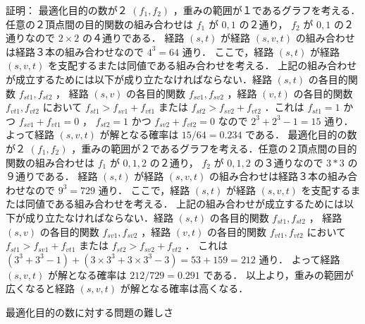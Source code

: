 \documentclass[12pt]{optlab-bachelor}
\begin{document}
証明：
最適化目的の数が２ $(f_1,f_2)$ ，重みの範囲が１であるグラフを考える．任意の２頂点間の目的関数の組み合わせは
$f_1$ が $0,1$ の２通り， $f_2$ が $0,1$ の２通りなので $2 \times 2$ の４通りである．
経路 $(s,t)$ が経路 $(s,v,t)$ の組み合わせは経路３本の組み合わせなので $4^3 = 64$ 通り．
ここで，経路 $(s,t)$ が経路 $(s,v,t)$ を支配するまたは同値である組み合わせを考える．
上記の組み合わせが成立するためには以下が成り立たなければならない．経路 $(s,t)$ の各目的関数 $f_{st1},f_{st2}$ ，
経路 $(s,v)$ の各目的関数 $f_{sv1},f_{sv2}$ ，経路 $(v,t)$ の各目的関数 $f_{vt1},f_{vt2}$ において
 $f_{st1}>f_{sv1}+f_{vt1}$ または $f_{st2}>f_{sv2}+f_{vt2}$ ．これは $f_{st1}=1$ かつ $f_{sv1}+f_{vt1}=0$ ，
 $f_{st2}=1$ かつ $f_{sv2}+f_{vt2}=0$ なので $2^3+2^3-1=15$ 通り．
よって経路 $(s,v,t)$ が解となる確率は $15/64=0.234$ である．
最適化目的の数が２ $(f_1,f_2)$ ，重みの範囲が２であるグラフを考える．任意の２頂点間の目的関数の組み合わせは
 $f_1$ が $0,1,2$ の２通り， $f_2$ が $0,1,2$ の３通りなので $3*3$ の９通りである．
経路 $(s,t)$ が経路 $(s,v,t)$ の組み合わせは経路３本の組み合わせなので $9^3 = 729$ 通り．
ここで，経路 $(s,t)$ が経路 $(s,v,t)$ を支配するまたは同値である組み合わせを考える．
上記の組み合わせが成立するためには以下が成り立たなければならない．経路 $(s,t)$ の各目的関数 $f_{st1},f_{st2}$ ，
経路 $(s,v)$ の各目的関数 $f_{sv1},f_{sv2}$ ，経路 $(v,t)$ の各目的関数 $f_{vt1},f_{vt2}$ において
 $f_{st1}>f_{sv1}+f_{vt1}$ または $f_{st2}>f_{sv2}+f_{vt2}$ ．
これは $(3^3+3^3-1)+(3 \times 3^3 + 3 \times 3^3 - 3)=53+159=212$ 通り．
よって経路 $(s,v,t)$ が解となる確率は $212/729=0.291$ である．
以上より，重みの範囲が広くなると経路 $(s,v,t)$ が解となる確率は高くなる．

\begin{description}
  \item[最適化目的の数に対する問題の難しさ]
\end{description}
\end{document}
